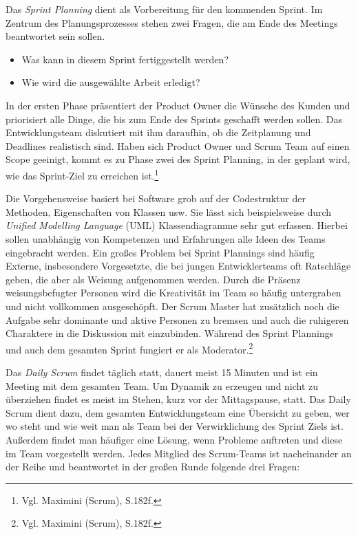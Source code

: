             Das \emph{Sprint Planning} dient als Vorbereitung für den kommenden Sprint. Im Zentrum des Planungsprozesses stehen zwei Fragen, die am Ende des Meetings beantwortet sein sollen.
            \begin{itemize}
                \item Was kann in diesem Sprint fertiggestellt werden?
                \item Wie wird die ausgewählte Arbeit erledigt?
            \end{itemize}

            In der ersten Phase präsentiert der Product Owner die Wünsche des Kunden und priorisiert alle Dinge, die bis zum Ende des Sprints geschafft werden sollen. Das Entwicklungsteam diskutiert mit ihm daraufhin, ob die Zeitplanung und Deadlines realistisch sind. Haben sich Product Owner und Scrum Team auf einen Scope geeinigt, kommt es zu Phase zwei des Sprint Planning, in der geplant wird, wie das Sprint-Ziel zu erreichen ist.\footnote{Vgl. Maximini (Scrum), S.182f.}

            Die Vorgehensweise basiert bei Software grob auf der Codestruktur der Methoden, Eigenschaften von Klassen usw. Sie lässt sich beispielsweise durch \emph{Unified Modelling Language} (UML) Klassendiagramme sehr gut erfassen. Hierbei sollen unabhängig von Kompetenzen und Erfahrungen alle Ideen des Teams eingebracht werden. Ein großes Problem bei Sprint Plannings sind häufig Externe, insbesondere Vorgesetzte, die bei jungen Entwicklerteams oft Ratschläge geben, die aber als Weisung aufgenommen werden. Durch die Präsenz weisungsbefugter Personen wird die Kreativität im Team so häufig untergraben und nicht vollkommen ausgeschöpft.
            Der Scrum Master hat zusätzlich noch die Aufgabe sehr dominante und aktive Personen zu bremsen und auch die ruhigeren Charaktere in die Diskussion mit einzubinden. Während des Sprint Plannings und auch dem gesamten Sprint fungiert er als Moderator.\footnote{Vgl. Maximini (Scrum), S.182f.}

            Das \emph{Daily Scrum} findet täglich statt, dauert meist 15 Minuten und ist ein Meeting mit dem gesamten Team. Um Dynamik zu erzeugen und nicht zu überziehen findet es meist im Stehen, kurz vor der Mittagspause, statt. Das Daily Scrum dient dazu, dem gesamten Entwicklungsteam eine Übersicht zu geben, wer wo steht und wie weit man als Team bei der Verwirklichung des Sprint Ziels ist. Außerdem findet man häufiger eine Lösung, wenn Probleme auftreten und diese im Team vorgestellt werden. Jedes Mitglied des Scrum-Teams ist nacheinander an der Reihe und beantwortet in der großen Runde folgende drei Fragen:

